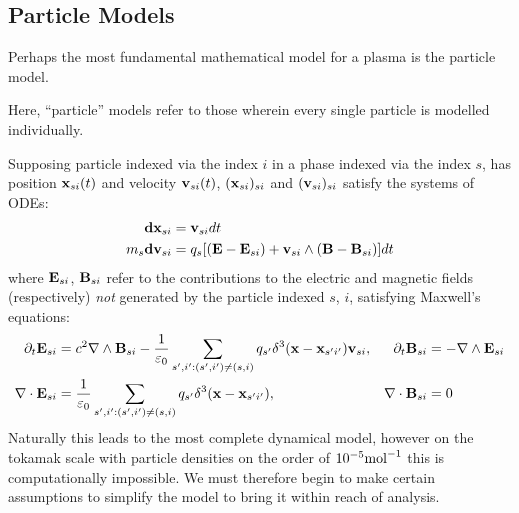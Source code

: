 \subsection*{Particle Models}
    Perhaps the most fundamental mathematical model for a plasma is the particle model.
    \begin{definition}
        Here, ``particle'' models refer to those wherein every single particle is modelled individually.
    \end{definition}
    Supposing particle indexed via the index $i$ in a phase indexed via the index $s$, has position $\mathbf{x}_{si}(t)$ and velocity $\mathbf{v}_{si}(t)$, $(\mathbf{x}_{si})_{si}$ and $(\mathbf{v}_{si})_{si}$ satisfy the systems of ODEs:
    \begin{align}
        \mathbf{d}\mathbf{x}_{si}  &=  \mathbf{v}_{si} dt  \label{patricle motion}  \\
        m_{s}\mathbf{d}\mathbf{v}_{si}  &=  q_{s}[(\mathbf{E} - \mathbf{E}_{si}) + \mathbf{v}_{si}\wedge(\mathbf{B} - \mathbf{B}_{si})]dt  \label{particle forcing}
    \end{align}
    where $\mathbf{E}_{si}$, $\mathbf{B}_{si}$ refer to the contributions to the electric and magnetic fields (respectively) \emph{not} generated by the particle indexed $s$, $i$, satisfying Maxwell's equations:
    \begin{align*}
        \partial_{t}\mathbf{E}_{si}  &=  c^{2}\nabla\wedge\mathbf{B}_{si} - \frac{1}{\varepsilon_{0}}\sum_{s', i' : (s', i') \neq (s, i)}q_{s'}\delta^{3}(\mathbf{x} - \mathbf{x}_{s'i'})\mathbf{v}_{si},  &
        \partial_{t}\mathbf{B}_{si}  &=  - \nabla\wedge\mathbf{E}_{si}  \\
        \nabla\cdot\mathbf{E}_{si}  &=  \frac{1}{\varepsilon_{0}}\sum_{s', i' : (s', i') \neq (s, i)}q_{s'}\delta^{3}(\mathbf{x} - \mathbf{x}_{s'i'}),  &
        \nabla\cdot\mathbf{B}_{si}  &=  0
    \end{align*}
    Naturally this leads to the most complete dynamical model, however on the tokamak scale with particle densities on the order of $10^{- 5}{\rm mol}^{- 1}$ this is computationally impossible. We must therefore begin to make certain assumptions to simplify the model to bring it within reach of analysis.
    